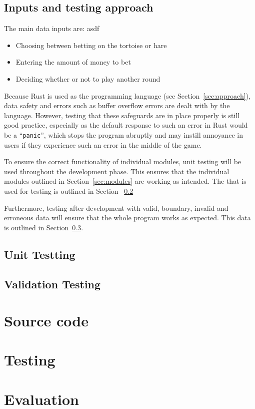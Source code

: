 \documentclass[11pt]{article}
\begin{document}
\subsection{Inputs and testing approach}
The main data inputs are: asdf
\begin{itemize}
	\item Choosing between betting on the tortoise or hare
	\item Entering the amount of money to bet
	\item Deciding whether or not to play another round
\end{itemize}

Because Rust is used as the programming language (see Section~\ref{sec:approach}), data safety
and errors such as buffer overflow errors are dealt with by the language. However, testing that
these safeguards are in place properly is still good practice, especially as the default response
to such an error in Rust would be a ``\texttt{panic}'', which stops the program abruptly and may
instill annoyance in users if they experience such an error in the middle of the game.

To ensure the correct functionality of individual modules, unit testing will be used throughout
the development phase. This ensures that the individual modules outlined in Section~\ref{sec:modules}
are working as intended. The that is used for testing is outlined in Section ~\ref{sec:unit-test}

Furthermore, testing after development with valid, boundary, invalid and erroneous data will ensure
that the whole program works as expected. This data is outlined in Section~\ref{sec:whole-test}.
\subsection{Unit Testting}
\label{sec:unit-test}
\subsection{Validation Testing}
\label{sec:whole-test}
\section{Source code}
\section{Testing}
\section{Evaluation}
\end{document}
